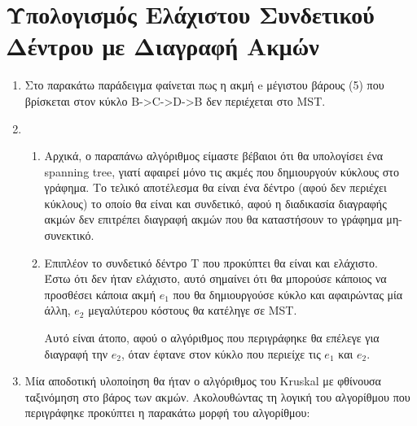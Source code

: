 \documentclass[a4paper,11pt]{article}
\begin{document}
\section{Υπολογισμός Ελάχιστου Συνδετικού Δέντρου με Διαγραφή Ακμών}
\begin{enumerate}
\item Στο παρακάτω παράδειγμα φαίνεται πως η ακμή e μέγιστου βάρους (5) που
βρίσκεται στον κύκλο B->C->D->B δεν περιέχεται στο MST.
\begin{figure}[ht]
    \centering
\hspace{1cm}
\end{figure}

\item
    \begin{enumerate}
	\item Αρχικά, ο παραπάνω αλγόριθμος είμαστε βέβαιοι ότι θα υπολογίσει
	ένα spanning tree, γιατί αφαιρεί μόνο τις ακμές που
	δημιουργούν κύκλους στο γράφημα. Το τελικό αποτέλεσμα θα είναι ένα
	δέντρο (αφού δεν περιέχει κύκλους) το οποίο θα είναι και συνδετικό,
	αφού η διαδικασία διαγραφής ακμών δεν επιτρέπει διαγραφή ακμών που θα
	καταστήσουν το γράφημα μη-συνεκτικό.
	\item Επιπλέον το συνδετικό δέντρο T που προκύπτει θα είναι και
	ελάχιστο.\\ Έστω ότι δεν ήταν ελάχιστο, αυτό σημαίνει ότι θα μπορούσε
	κάποιος να προσθέσει κάποια ακμή $e_1$ που θα δημιουργούσε κύκλο και
	αφαιρώντας μία άλλη, $e_2$ μεγαλύτερου κόστους θα κατέληγε σε MST.

	Αυτό είναι άτοπο, αφού ο αλγόριθμος που περιγράφηκε θα επέλεγε για
	διαγραφή την $e_2$, όταν έφτανε στον κύκλο που περιείχε τις $e_1$ και
	$e_2$.
    \end{enumerate}
\item
Μία αποδοτική υλοποίηση θα ήταν ο αλγόριθμος του Kruskal με φθίνουσα
ταξινόμηση στο βάρος των ακμών. Ακολουθώντας τη λογική του αλγορίθμου που
περιγράφηκε προκύπτει η παρακάτω μορφή του αλγορίθμου:


\end{enumerate}
\end{document}
